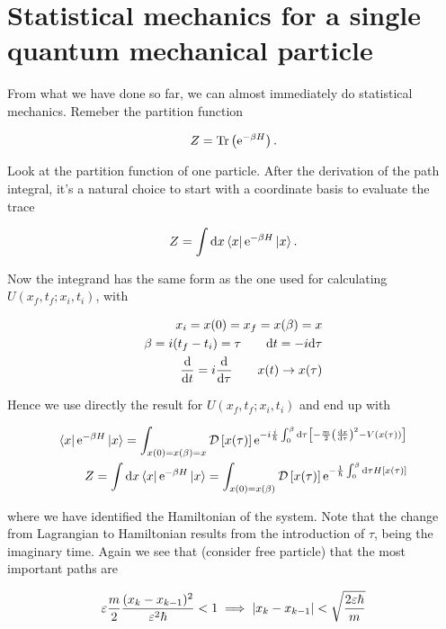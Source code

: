 \section{Statistical mechanics for a single quantum mechanical particle}

From what we have done so far, we can almost immediately do statistical mechanics. Remeber the partition function 

\begin{equation*}
    Z = \Tr \left( \mathrm{e}^{-\beta H} \right). 
\end{equation*}

Look at the partition function of one particle. After the derivation of the path integral, it's a natural choice to start with a coordinate basis to evaluate the trace

\begin{equation*}
    Z = \int \dd x \bra{x} \mathrm{e}^{-\beta H} \ket{x}. 
\end{equation*}

Now the integrand has the same form as the one used for calculating $U(x_{f}, t_{f} ; x_{i}, t_{i})$, with 

\begin{align*}
    x_{i} = x(0) = x_{f} = x(\beta) = x \\ 
    \beta = i(t_{f} - t_{i}) = \tau \quad \quad \dd t = -i \dd \tau \\ 
    \dv{}{t} = i \dv{}{\tau} \quad \quad x(t) \to x(\tau) 
\end{align*}

Hence we use directly the result for $U(x_{f}, t_{f} ; x_{i}, t_{i})$ and end up with

\begin{align}
    \bra{x} \mathrm{e}^{-\beta H} \ket{x} = \int_{x(0) = x(\beta) = x} \mathcal{D} \left[x(\tau)\right]\mathrm{e}^{-i \frac{i}{\hbar} \int_{0}^{\beta} \dd \tau \left[ -\frac{m}{2}\left(\dv{x}{\tau}\right)^{2} - V(x(\tau)) \right]} \nonumber \\ 
    Z = \int \dd x \bra{x} \mathrm{e}^{-\beta H} \ket{x} = \int_{x(0) = x(\beta)} \mathcal{D} \left[x(\tau)\right] \mathrm{e}^{-\frac{1}{\hbar}\int_{0}^{\beta} \dd \tau H\left[x(\tau)\right]}
\end{align}

where we have identified the Hamiltonian of the system. Note that the change from Lagrangian to Hamiltonian results from the introduction of $\tau$, being the imaginary time. Again we see that (consider free particle) that the most important paths are 

\begin{equation*}
    \varepsilon \frac{m}{2} \frac{(x_{k} - x_{k-1})^{2}}{\varepsilon^{2} \hbar} < 1 \implies \abs{x_{k} - x_{k-1}} < \sqrt{\frac{2\varepsilon \hbar}{m}}
\end{equation*}

